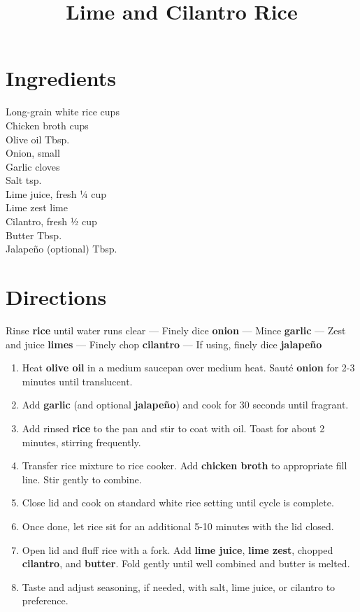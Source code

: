 \documentclass[11pt,letterpaper]{article}
\title{Lime and Cilantro Rice}
\author{}
\date{}
\begin{document}
\maketitle
\thispagestyle{empty}

\section*{Ingredients}
\setlength{\columnsep}{20pt}
\begin{multicols}{2}
\noindent
    Long-grain white rice  cups \\
    Chicken broth  cups \\
    Olive oil  Tbsp. \\
    Onion, small  \\
    Garlic cloves  \\
    Salt  tsp. \\
    \columnbreak
    Lime juice, fresh \dotfill ¼ cup \\
    Lime zest  lime \\
    Cilantro, fresh \dotfill ½ cup \\
    Butter  Tbsp. \\
    Jalapeño (optional)  Tbsp. \\
\end{multicols}

\section*{Directions}

\noindent
Rinse \textbf{rice} until water runs clear ---
Finely dice \textbf{onion} ---
Mince \textbf{garlic} ---
Zest and juice \textbf{limes} ---
Finely chop \textbf{cilantro} ---
If using, finely dice \textbf{jalapeño}

\begin{enumerate}
    \item Heat \textbf{olive oil} in a medium saucepan over medium heat. Sauté \textbf{onion} for 2-3 minutes until translucent.
    \item Add \textbf{garlic} (and optional \textbf{jalapeño}) and cook for 30 seconds until fragrant.
    \item Add rinsed \textbf{rice} to the pan and stir to coat with oil. Toast for about 2 minutes, stirring frequently.
    \item Transfer rice mixture to rice cooker. Add \textbf{chicken broth} to appropriate fill line. Stir gently to combine.
    \item Close lid and cook on standard white rice setting until cycle is complete.
    \item Once done, let rice sit for an additional 5-10 minutes with the lid closed.
    \item Open lid and fluff rice with a fork. Add \textbf{lime juice}, \textbf{lime zest}, chopped \textbf{cilantro}, and \textbf{butter}. Fold gently until well combined and butter is melted.
    \item Taste and adjust seasoning, if needed, with salt, lime juice, or cilantro to preference.
\end{enumerate}
\end{document}
